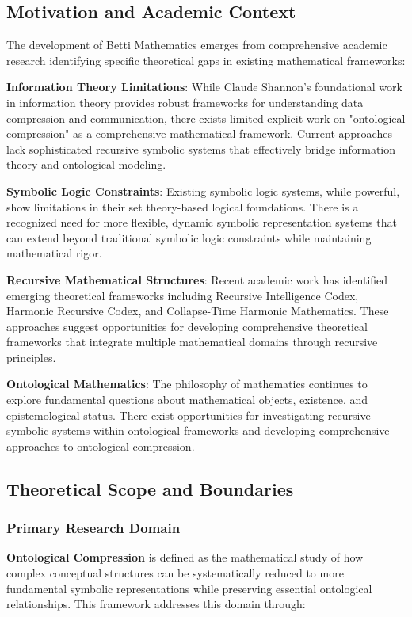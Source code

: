 \subsection{Motivation and Academic Context}

The development of Betti Mathematics emerges from comprehensive academic research identifying specific theoretical gaps in existing mathematical frameworks:

\textbf{Information Theory Limitations}: While Claude Shannon's foundational work in information theory provides robust frameworks for understanding data compression and communication, there exists limited explicit work on "ontological compression" as a comprehensive mathematical framework. Current approaches lack sophisticated recursive symbolic systems that effectively bridge information theory and ontological modeling.

\textbf{Symbolic Logic Constraints}: Existing symbolic logic systems, while powerful, show limitations in their set theory-based logical foundations. There is a recognized need for more flexible, dynamic symbolic representation systems that can extend beyond traditional symbolic logic constraints while maintaining mathematical rigor.

\textbf{Recursive Mathematical Structures}: Recent academic work has identified emerging theoretical frameworks including Recursive Intelligence Codex, Harmonic Recursive Codex, and Collapse-Time Harmonic Mathematics. These approaches suggest opportunities for developing comprehensive theoretical frameworks that integrate multiple mathematical domains through recursive principles.

\textbf{Ontological Mathematics}: The philosophy of mathematics continues to explore fundamental questions about mathematical objects, existence, and epistemological status. There exist opportunities for investigating recursive symbolic systems within ontological frameworks and developing comprehensive approaches to ontological compression.

\subsection{Theoretical Scope and Boundaries}

\subsubsection{Primary Research Domain}
\textbf{Ontological Compression} is defined as the mathematical study of how complex conceptual structures can be systematically reduced to more fundamental symbolic representations while preserving essential ontological relationships. This framework addresses this domain through:

